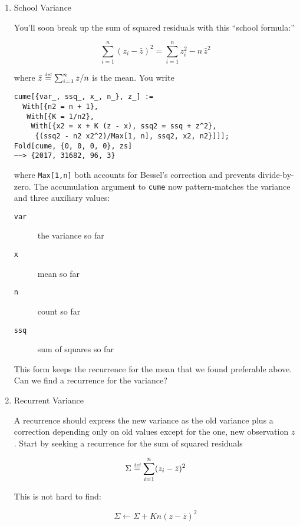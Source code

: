\documentclass[10pt,oneside,x11names]{article}
\begin{document}
\begin{enumerate}
\item School Variance
\label{sec:orgheadline7}

You'll soon break up the sum of squared residuals with this ``school formula:''

\begin{equation}
\sum_{i=1}^n{(z_i-\bar{z})^2}=\sum_{i=1}^n{z_i^2}-n\,\bar{z}^2
\end{equation}

\noindent where \(\bar{z}\stackrel{\text{\tiny def}}{=} \sum_{i=1}^nz/n\) is the
mean. You write

\begin{verbatim}
cume[{var_, ssq_, x_, n_}, z_] :=
  With[{n2 = n + 1},
   With[{K = 1/n2},
    With[{x2 = x + K (z - x), ssq2 = ssq + z^2},
     {(ssq2 - n2 x2^2)/Max[1, n], ssq2, x2, n2}]]];
Fold[cume, {0, 0, 0, 0}, zs]
~~> {2017, 31682, 96, 3}
\end{verbatim}

\noindent where \texttt{Max[1,n]} both accounts for Bessel's correction and prevents
divide-by-zero. The accumulation argument to \texttt{cume} now pattern-matches the
variance and three auxiliary values:
\begin{description}
\item[{\texttt{var}}] the variance so far
\item[{\texttt{x}}] mean so far
\item[{\texttt{n} }] count so far
\item[{\texttt{ssq}}] sum of squares so far
\end{description}
This form keeps the recurrence for the mean that we found preferable above. Can
we find a recurrence for the variance?

\item Recurrent Variance
\label{sec:orgheadline8}

A recurrence should express the new variance as the old variance plus a
correction depending only on old values except for the one, new observation $z$.
Start by seeking a recurrence for the sum of squared residuals

\begin{equation}
\Sigma\stackrel{\text{\tiny def}}{=}\sum_{i=1}^{n}(z_i-\bar{z})^2
\end{equation}

\noindent This is not hard to find:

\begin{equation}
\Sigma \leftarrow \Sigma + K n (z-\bar{z})^2
\end{equation}


\end{enumerate}
\end{document}
